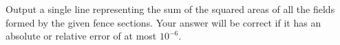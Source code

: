 

Output a single line representing the sum of the squared areas of all the fields formed by the given fence sections.
Your answer will be correct if it has an absolute or relative error of at most $10^{-6}$.

